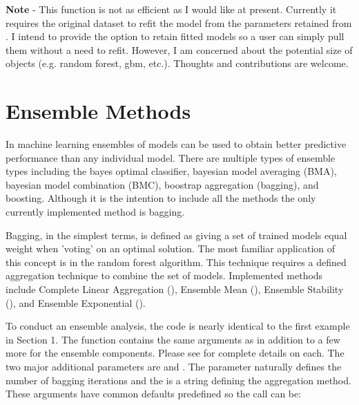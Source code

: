 \documentclass[12pt]{article}\usepackage[]{graphicx}\usepackage[usenames,dvipsnames]{color}
\begin{document}
\textbf{Note} - This function is not as efficient as I would like at present.
Currently it requires the original dataset to refit the model from the 
parameters retained from .  I intend to provide the
option to retain fitted models so a user can simply pull them without a need
to refit.  However, I am concerned about the potential size of objects (e.g. 
random forest, gbm, etc.).  Thoughts and contributions are welcome.


\newpage
\maketitle
\section{Ensemble Methods}

In machine learning ensembles of models can be used to obtain better predictive
performance than any individual model.  There are multiple types of ensemble
types including the bayes optimal classifier, bayesian model averaging (BMA),
bayesian model combination (BMC), boostrap aggregation (bagging), and boosting. 
Although it is the intention to include all the methods the only currently
implemented method is bagging.

Bagging, in the simplest terms, is defined as giving a set of trained models
equal weight when 'voting' on an optimal solution.  The most familiar 
application of this concept is in the random forest algorithm.  This technique
requires a defined aggregation technique to combine the set of models.  
Implemented methods include Complete Linear Aggregation (), 
Ensemble Mean (), Ensemble Stability (), and
Ensemble Exponential ().

To conduct an ensemble analysis, the code is nearly identical to the first
example in Section 1.  The  function contains
the same arguments as  in addition to a few more for
the ensemble components.  Please see  for
complete details on each.  The two major additional parameters are 
 and .  The  parameter
naturally defines the number of bagging iterations and the 
 is a string defining the aggregation method.  These
arguments have common defaults predefined so the call can be:
\end{document}
